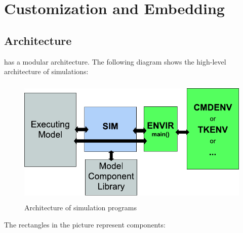 \chapter{Customization and Embedding}
\label{cha:opp-design}

\section{Architecture}

{\opp} has a modular architecture. The following diagram shows the
high-level architecture of {\opp} simulations:

\begin{figure}[htbp]
  \begin{center}
    \includegraphics[width=4.757in, height=2.412in]{figures/usmanFig18}
    \caption{Architecture of {\opp} simulation programs}
  \end{center}
\end{figure}

The rectangles in the picture represent components:


